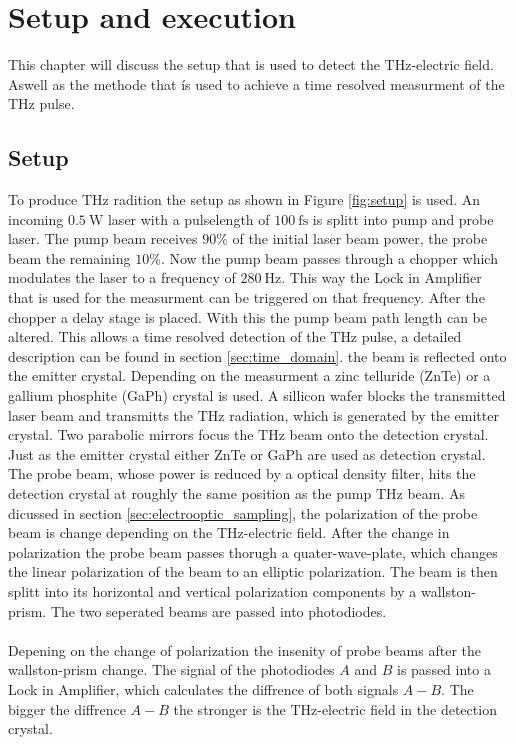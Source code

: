 \chapter{Setup and execution}
This chapter will discuss the setup that is used to detect the $\si{\tera\hertz}$-electric field.
Aswell as the methode that ís used to achieve a time resolved measurment of the $\si{\tera\hertz}$ pulse.

\section{Setup}
\label{Setup}
To produce $\si{\tera\hertz}$ radition the setup as shown in Figure \ref{fig:setup} is used.
An incoming $\SI{0.5}{\W}$ laser with a pulselength of $\SI{100}{\femto\second}$ is splitt into pump and probe laser.
The pump beam receives $90\%$ of the initial laser beam power, the probe beam the remaining $10\%$.
Now the pump beam passes through a chopper which modulates the laser to a frequency of $\SI{280}{\hertz}$.
This way the Lock in Amplifier that is used for the measurment can be triggered on that frequency.
After the chopper a delay stage is placed.
With this the pump beam path length can be altered.
This allows a time resolved detection of the $\si{\tera\hertz}$ pulse, a detailed description can be found in section \ref{sec:time_domain}.
 the beam is reflected onto the emitter crystal.
Depending on the measurment a zinc telluride (ZnTe) or a gallium phosphite (GaPh) crystal is used.
A sillicon wafer blocks the transmitted laser beam and transmitts the $\si{\tera\hertz}$ radiation, which is generated by the emitter crystal.
Two parabolic mirrors focus the $\si{\tera\hertz}$ beam onto the detection crystal.
Just as the emitter crystal either ZnTe or GaPh are used as detection crystal.
The probe beam, whose power is reduced by a optical density filter, hits the detection crystal at roughly the same position as the pump $\si{\tera\hertz}$ beam.
As dicussed in section \ref{sec:electrooptic_sampling}, the polarization of the probe beam is change depending on the $\si{\tera\hertz}$-electric field.
After the change in polarization the probe beam passes thorugh a quater-wave-plate, which changes the linear polarization of the beam to an elliptic polarization.
The beam is then splitt into its horizontal and vertical polarization components by a wallston-prism.
The two seperated beams are passed into photodiodes.
\\\\
Depening on the change of polarization the insenity of probe beams after the wallston-prism change.
The signal of the photodiodes $A$ and $B$ is passed into a Lock in Amplifier, which calculates the diffrence of both signals $A-B$.
The bigger the diffrence $A-B$ the stronger is the $\si{\tera\hertz}$-electric field in the detection crystal.

